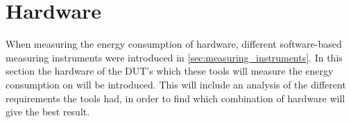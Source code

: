 \section{Hardware}\label{sec:hardware}

When measuring the energy consumption of hardware, different software-based measuring instruments were introduced in \cref{sec:measuring_instruments}. In this section the hardware of the DUT's which these tools will measure the energy consumption on will be introduced. This will include an analysis of the different requirements the tools had, in order to find which combination of hardware will give the best result.



